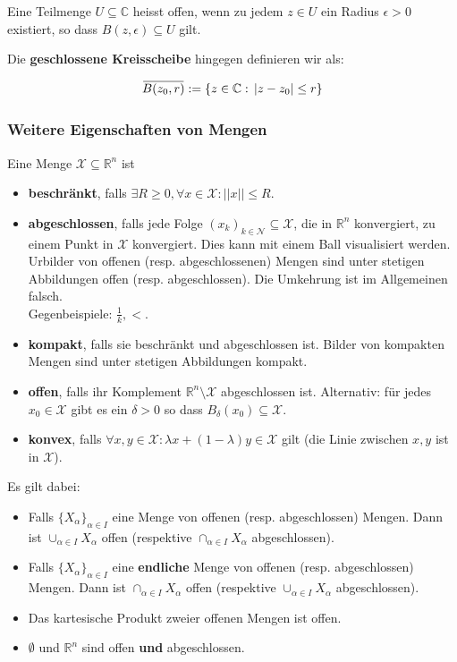 \documentclass[a4paper,10pt]{article}
\def\X{\mathcal{X}}
\def\N{\mathcal{N}}
\def\R{\mathbb{R}}
\def\C{\mathbb{C}}
\newcommand{\overbar}[1]{\mkern 1.5mu\overline{\mkern-1.5mu#1\mkern-1.5mu}\mkern 1.5mu}
\begin{document}
Eine Teilmenge $U \subseteq \C$ heisst offen, wenn zu jedem $z \in U$ ein Radius $\epsilon>0$ existiert, so dass $B(z,\epsilon) \subseteq U$ gilt.

Die \textbf{geschlossene Kreisscheibe} hingegen definieren wir als:

$$
\overbar{B(z_0, r)} := \{ z \in \mathbb{C} : \, |z-z_0| \leq r \}
$$

\subsubsection{Weitere Eigenschaften von Mengen}

Eine Menge \(\X \subseteq \R^n \) ist
\begin{itemize}
  \item \textbf{beschränkt}, falls \(\exists R \ge 0, \forall x \in \X: ||x|| \le R\).
  \item \textbf{abgeschlossen}, falls jede Folge \((x_k)_{k\in \N} \subseteq \X\), die in \(\R^n\) konvergiert, zu einem Punkt in \(\X\) konvergiert. Dies kann mit einem Ball visualisiert werden. \\Urbilder von offenen (resp. abgeschlossenen) Mengen sind unter stetigen Abbildungen offen (resp. abgeschlossen). Die Umkehrung ist im Allgemeinen falsch.\\
  Gegenbeispiele: \(\frac{1}{k}, <\).
  \item \textbf{kompakt}, falls sie beschränkt und abgeschlossen ist. Bilder von kompakten Mengen sind unter stetigen Abbildungen kompakt.
  \item \textbf{offen}, falls ihr Komplement \(\R^n \setminus \X\) abgeschlossen ist. Alternativ: für jedes $x_0 \in \X$ gibt es ein $\delta > 0$ so dass $B_\delta(x_0) \subseteq \X$.
  \item \textbf{konvex}, falls \(\forall x, y \in \X: \lambda x + (1 - \lambda)y \in \X\) gilt (die Linie zwischen \(x, y\) ist in \(\X\)).
\end{itemize}

Es gilt dabei:

\begin{itemize}
  \item Falls $\{X_\alpha\}_{\alpha \in I}$ eine Menge von offenen (resp. abgeschlossen) Mengen. Dann ist $\cup_{\alpha \in I} X_\alpha$ offen (respektive $\cap_{\alpha \in I} X_\alpha$ abgeschlossen).
  \item Falls $\{X_\alpha\}_{\alpha \in I}$ eine \textbf{endliche} Menge von offenen (resp. abgeschlossen) Mengen. Dann ist $\cap_{\alpha \in I} X_\alpha$ offen (respektive $\cup_{\alpha \in I} X_\alpha$ abgeschlossen).
  \item Das kartesische Produkt zweier offenen Mengen ist offen.
  \item $\emptyset$ und $\R^n$ sind offen \textbf{und} abgeschlossen.
\end{itemize}
\end{document}
